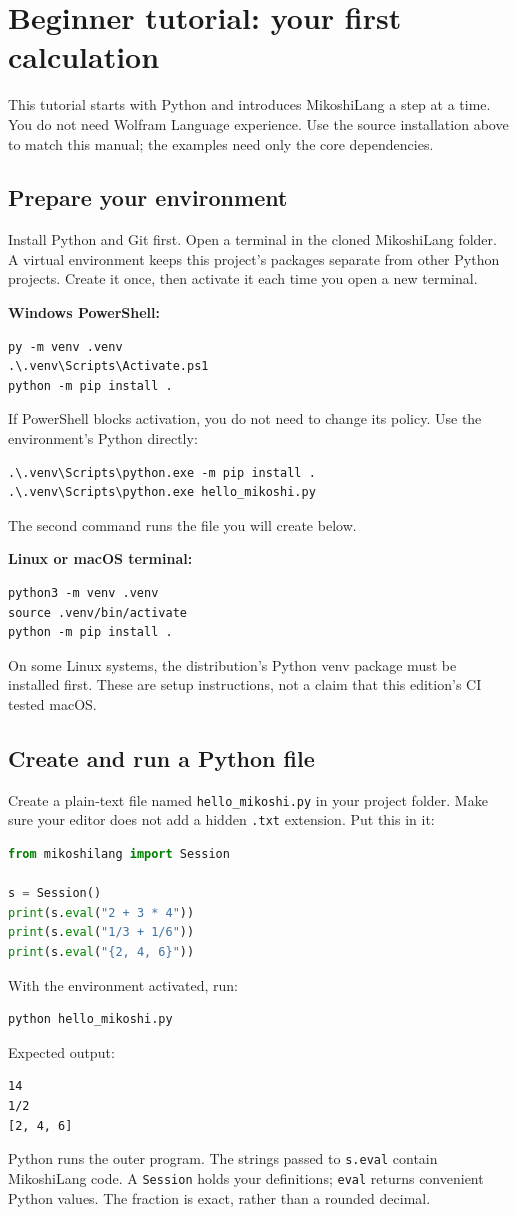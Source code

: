 \section{Beginner tutorial: your first calculation}
This tutorial starts with Python and introduces MikoshiLang a step at a time. You do not need Wolfram Language experience. Use the source installation above to match this manual; the examples need only the core dependencies.

\subsection{Prepare your environment}
Install Python and Git first. Open a terminal in the cloned MikoshiLang folder. A virtual environment keeps this project's packages separate from other Python projects. Create it once, then activate it each time you open a new terminal.

\textbf{Windows PowerShell:}
\begin{lstlisting}
py -m venv .venv
.\.venv\Scripts\Activate.ps1
python -m pip install .
\end{lstlisting}
If PowerShell blocks activation, you do not need to change its policy. Use the environment's Python directly:
\begin{lstlisting}
.\.venv\Scripts\python.exe -m pip install .
.\.venv\Scripts\python.exe hello_mikoshi.py
\end{lstlisting}
The second command runs the file you will create below.

\textbf{Linux or macOS terminal:}
\begin{lstlisting}
python3 -m venv .venv
source .venv/bin/activate
python -m pip install .
\end{lstlisting}
On some Linux systems, the distribution's Python venv package must be installed first. These are setup instructions, not a claim that this edition's CI tested macOS.

\subsection{Create and run a Python file}
Create a plain-text file named \texttt{hello\_mikoshi.py} in your project folder. Make sure your editor does not add a hidden \texttt{.txt} extension. Put this in it:
\begin{lstlisting}[language=Python]
from mikoshilang import Session

s = Session()
print(s.eval("2 + 3 * 4"))
print(s.eval("1/3 + 1/6"))
print(s.eval("{2, 4, 6}"))
\end{lstlisting}
With the environment activated, run:
\begin{lstlisting}
python hello_mikoshi.py
\end{lstlisting}
Expected output:
\begin{lstlisting}
14
1/2
[2, 4, 6]
\end{lstlisting}
Python runs the outer program. The strings passed to \texttt{s.eval} contain MikoshiLang code. A \texttt{Session} holds your definitions; \texttt{eval} returns convenient Python values. The fraction is exact, rather than a rounded decimal.

